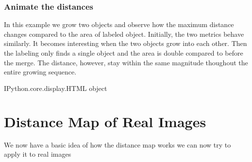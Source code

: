\documentclass[letterpaper,10pt,english]{sphinxmanual}
\begin{document}
\begin{sphinxVerbatim}[commandchars=\\\{\}]
  
\end{sphinxVerbatim}


\subsection{Animate the distances}
\label{\detokenize{06-AdvancedShapeAndTexture:animate-the-distances}}
\sphinxAtStartPar
In this example we grow two objects and observe how the maximum distance changes compared to the area of labeled object. Initially, the two metrics behave similarly. It becomes interesting when the two objects grow into each other. Then the labeling only finds a single object and the area is double compared to before the merge. The distance, however, stay within the same magnitude thoughout the entire growing sequence.

\begin{sphinxVerbatim}[commandchars=\\\{\}]
\end{sphinxVerbatim}

\begin{sphinxVerbatim}[commandchars=\\\{\}]
\PYGZlt{}IPython.core.display.HTML object\PYGZgt{}
\end{sphinxVerbatim}


\chapter{Distance Map of Real Images}
\label{\detokenize{06-AdvancedShapeAndTexture:distance-map-of-real-images}}
\sphinxAtStartPar
We now have a basic idea of how the distance map works we can now try to apply it to real images
\end{document}
